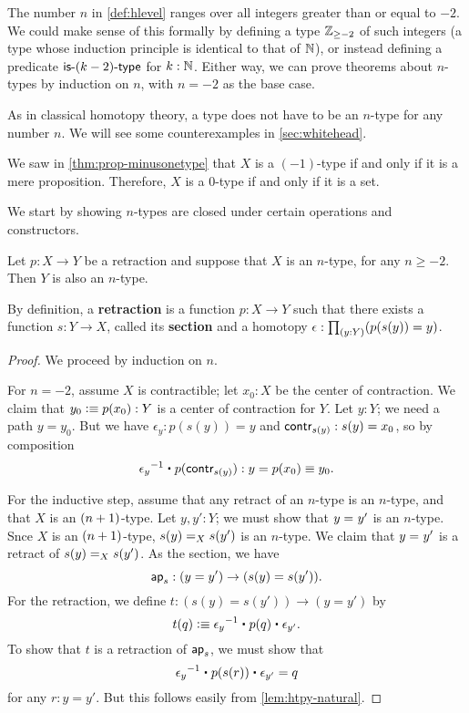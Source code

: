 \begin{rmk}
  The number $n$ in \autoref{def:hlevel} ranges over all integers greater than or equal to $-2$.
  We could make sense of this formally by defining a type $\Z_{{\geq}-2}$ of such integers (a type whose induction principle is identical to that of $\Nat$), or instead defining a predicate $\istype{(k-2)}$ for $k : \Nat$.
  Either way, we can prove theorems about $n$-types by induction on $n$, with $n = -2$ as the base case.
\end{rmk}

As in classical homotopy theory, a type does not have to be an $n$-type for any number $n$.
We will see some counterexamples in \autoref{sec:whitehead}.

\begin{eg}
  We saw in \autoref{thm:prop-minusonetype} that $X$ is a $(-1)$-type if and only if it is a mere proposition.
  Therefore, $X$ is a $0$-type if and only if it is a set.
\end{eg}

We start by showing $n$-types are closed under certain operations and constructors.

\begin{thm}\label{thm:h-level-retracts}
 Let $p : X \to Y$ be a retraction and suppose that $X$ is an $n$-type, for any $n\geq -2$.
 Then $Y$ is also an $n$-type.
\end{thm}

By definition, a \textbf{retraction} is a function $p : X \to Y$ such that there exists a function $s : Y \to X$, called its \textbf{section} and a homotopy $\epsilon:\prd{y:Y} (p(s(y))=y)$.

\begin{proof}
 We proceed by induction on $n$.

 For $n=-2$, assume $X$ is contractible; let $x_0 : X$ be the center of contraction.
 We claim that $y_0 \defeq p(x_0) : Y$ is a center of contraction for $Y$.
 Let $y : Y$; we need a path $y = y_0$.
 But we have $\epsilon_y : p(s(y)) = y$ and $\contr_{s(y)} : s(y) = x_0$, so by composition
 \[ \opp{\epsilon_y} \ct \ap{p}{\contr_{s(y)}} : y = p(x_0) \jdeq y_0 .\]

 For the inductive step, assume that any retract of an $n$-type is an $n$-type, and that $X$ is an $\nplusone$-type.
 Let $y, y' : Y$; we must show that $\id{y}{y'}$ is an $n$-type.
 Snce $X$ is an $\nplusone$-type, $\id[X]{s(y)}{s(y')}$ is an $n$-type.
 We claim that $\id{y}{y'}$ is a retract of $\id[X]{s(y)}{s(y')}$.
 As the section, we have
 \[ \apfunc s : (y=y') \to (s(y)=s(y')). \]
 For the retraction, we define $t:(s(y)=s(y'))\to(y=y')$ by
 \[ t(q) \defeq  \opp{\epsilon_y} \ct \ap p q \ct \epsilon_{y'}.\]
 To show that $t$ is a retraction of $\apfunc s$, we must show that
 \[ \opp{\epsilon_y} \ct \ap p {\ap sr} \ct \epsilon_{y'} = q \]
 for any $r:y=y'$.
 But this follows easily from \autoref{lem:htpy-natural}.
\end{proof}

